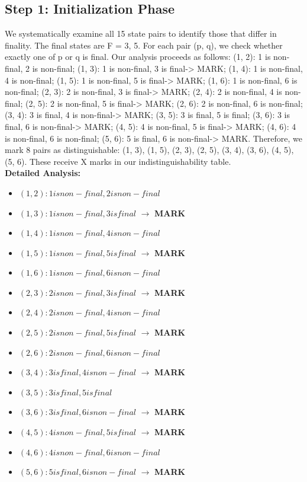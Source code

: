 \documentclass{article}
\begin{document}
\subsection*{Step 1: Initialization Phase}
We systematically examine all 15 state pairs to identify those that differ in finality. The final states are F = {3, 5}. For each pair (p, q), we check whether exactly one of p or q is final. Our analysis proceeds as follows: (1, 2): 1 is non-final, 2 is non-final; (1, 3): 1 is non-final, 3 is final-> MARK; (1, 4): 1 is non-final, 4 is non-final; (1, 5): 1 is non-final, 5 is final-> MARK; (1, 6): 1 is non-final, 6 is non-final; (2, 3): 2 is non-final, 3 is final-> MARK; (2, 4): 2 is non-final, 4 is non-final; (2, 5): 2 is non-final, 5 is final-> MARK; (2, 6): 2 is non-final, 6 is non-final; (3, 4): 3 is final, 4 is non-final-> MARK; (3, 5): 3 is final, 5 is final; (3, 6): 3 is final, 6 is non-final-> MARK; (4, 5): 4 is non-final, 5 is final-> MARK; (4, 6): 4 is non-final, 6 is non-final; (5, 6): 5 is final, 6 is non-final-> MARK. Therefore, we mark 8 pairs as distinguishable: (1, 3), (1, 5), (2, 3), (2, 5), (3, 4), (3, 6), (4, 5), (5, 6). These receive X marks in our indistinguishability table.
\\[0.5em]
\textbf{Detailed Analysis:}
\begin{itemize}
  \item $(1, 2): 1 is non-final, 2 is non-final$
  \item $(1, 3): 1 is non-final, 3 is final$ $\rightarrow$ \textbf{MARK}
  \item $(1, 4): 1 is non-final, 4 is non-final$
  \item $(1, 5): 1 is non-final, 5 is final$ $\rightarrow$ \textbf{MARK}
  \item $(1, 6): 1 is non-final, 6 is non-final$
  \item $(2, 3): 2 is non-final, 3 is final$ $\rightarrow$ \textbf{MARK}
  \item $(2, 4): 2 is non-final, 4 is non-final$
  \item $(2, 5): 2 is non-final, 5 is final$ $\rightarrow$ \textbf{MARK}
  \item $(2, 6): 2 is non-final, 6 is non-final$
  \item $(3, 4): 3 is final, 4 is non-final$ $\rightarrow$ \textbf{MARK}
  \item $(3, 5): 3 is final, 5 is final$
  \item $(3, 6): 3 is final, 6 is non-final$ $\rightarrow$ \textbf{MARK}
  \item $(4, 5): 4 is non-final, 5 is final$ $\rightarrow$ \textbf{MARK}
  \item $(4, 6): 4 is non-final, 6 is non-final$
  \item $(5, 6): 5 is final, 6 is non-final$ $\rightarrow$ \textbf{MARK}
\end{itemize}
\end{document}
